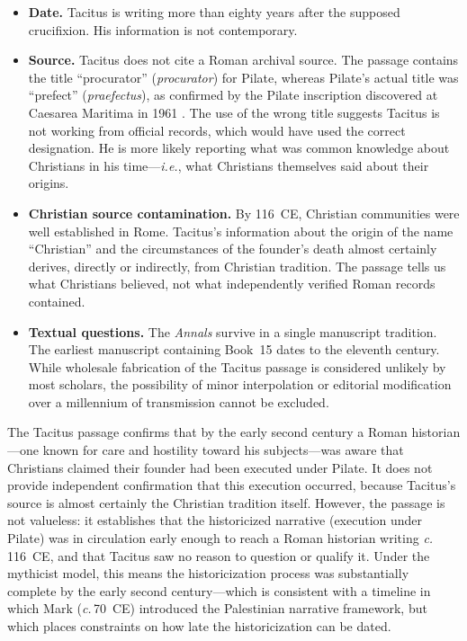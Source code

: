 \documentclass[12pt,oneside]{article}
\newcommand{\ie}{\textit{i.e.}}
\newcommand{\circa}{\textit{c.}\,}
\begin{document}
\begin{itemize}[leftmargin=2em]
\item \textbf{Date.}  Tacitus is writing more than eighty years after
the supposed crucifixion.  His information is not contemporary.

\item \textbf{Source.}  Tacitus does not cite a Roman archival source.
The passage contains the title ``procurator'' (\textit{procurator})
for Pilate, whereas Pilate's actual title was ``prefect''
(\textit{praefectus}), as confirmed by the Pilate inscription
discovered at Caesarea Maritima in 1961 \citep{Vardaman1962}.  The
use of the wrong title suggests Tacitus is not working from official
records, which would have used the correct designation.  He is more
likely reporting what was common knowledge about Christians in his
time---\ie, what Christians themselves said about their origins.

\item \textbf{Christian source contamination.}  By 116~CE, Christian
communities were well established in Rome.  Tacitus's information
about the origin of the name ``Christian'' and the circumstances of
the founder's death almost certainly derives, directly or indirectly,
from Christian tradition.  The passage tells us what Christians
believed, not what independently verified Roman records contained.

\item \textbf{Textual questions.}  The \textit{Annals} survive in a
single manuscript tradition.  The earliest manuscript containing
Book~15 dates to the eleventh century.  While wholesale fabrication
of the Tacitus passage is considered unlikely by most scholars, the
possibility of minor interpolation or editorial modification over a
millennium of transmission cannot be excluded.
\end{itemize}

The Tacitus passage confirms that by the early second century a Roman
historian---one known for care and hostility toward his subjects---was
aware that Christians claimed their founder had been executed under
Pilate.  It does not provide independent confirmation that this
execution occurred, because Tacitus's source is almost certainly the
Christian tradition itself.  However, the passage is not valueless: it
establishes that the historicized narrative (execution under Pilate) was
in circulation early enough to reach a Roman historian writing
\circa 116~CE, and that Tacitus saw no reason to question or qualify it.
Under the mythicist model, this means the historicization process was
substantially complete by the early second century---which is consistent
with a timeline in which Mark (\circa 70~CE) introduced the Palestinian
narrative framework, but which places constraints on how late the
historicization can be dated.
\end{document}
